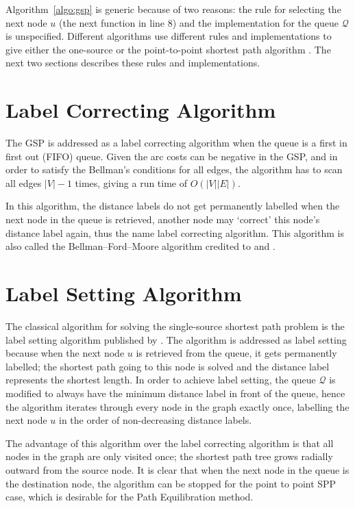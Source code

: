 Algorithm~\ref{algo:gsp} is generic because of two reasons:
the rule for selecting the next node $u$ (the next function in line 8) and
the implementation for the queue $\mathcal{Q}$ is unspecified.
Different algorithms use different rules and implementations to give 
either the one-source or the point-to-point shortest path algorithm \citep{mplomer}.
The next two sections describes these rules and implementations.

\section{Label Correcting Algorithm}
\label{section:labelcorrectingalgorithm}
The GSP is addressed as a label correcting algorithm when the queue is a first in first out (FIFO) queue.
Given the arc costs can be negative in the GSP,
and in order to satisfy the Bellman's conditions for all edges,
the algorithm has to scan all edges $|V|-1$ times,
giving a run time of $O(|V||E|)$.

In this algorithm,
the distance labels do not get permanently labelled when the next node in the queue is retrieved,
another node may `correct' this node's distance label again,
thus the name label correcting algorithm.
This algorithm is also called the Bellman–Ford–Moore algorithm credited to \citet{Bellman, Ford} and \citet{Moore}.

\section{Label Setting Algorithm}
\label{section:labelsettingalgorithm}
The classical algorithm for solving the single-source shortest path problem is the label setting algorithm published by \citet{Dijkstra}.
The algorithm is addressed as label setting because when the next node $u$ is retrieved from the queue,
it gets permanently labelled;
the shortest path going to this node is solved and 
the distance label represents the shortest length.
In order to achieve label setting, 
the queue $\mathcal{Q}$ is modified to always have the minimum distance label in front of the queue,
hence the algorithm iterates through every node in the graph exactly once,
labelling the next node $u$ in the order of non-decreasing distance labels.

The advantage of this algorithm over the label correcting algorithm is
that all nodes in the graph are only visited once;
the shortest path tree grows radially outward from the source node.
It is clear that when the next node in the queue is the destination node,
the algorithm can be stopped for the point to point SPP case,
which is desirable for the Path Equilibration method.

